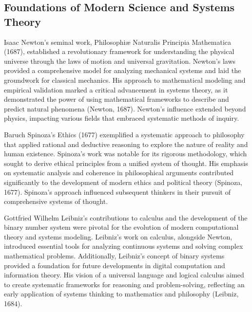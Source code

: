 \documentclass[twocolumn]{article}
\begin{document}
\subsection{Foundations of Modern Science and Systems Theory}

\textcolor{primary}{Isaac Newton’s seminal work, Philosophiæ Naturalis Principia Mathematica (1687), established a revolutionary framework for understanding the physical universe through the laws of motion and universal gravitation. Newton’s laws provided a comprehensive model for analyzing mechanical systems and laid the groundwork for classical mechanics. His approach to mathematical modeling and empirical validation marked a critical advancement in systems theory, as it demonstrated the power of using mathematical frameworks to describe and predict natural phenomena (Newton, 1687). Newton’s influence extended beyond physics, impacting various fields that embraced systematic methods of inquiry.}

\textcolor{secondary}{Baruch Spinoza’s Ethics (1677) exemplified a systematic approach to philosophy that applied rational and deductive reasoning to explore the nature of reality and human existence. Spinoza’s work was notable for its rigorous methodology, which sought to derive ethical principles from a unified system of thought. His emphasis on systematic analysis and coherence in philosophical arguments contributed significantly to the development of modern ethics and political theory (Spinoza, 1677). Spinoza’s approach influenced subsequent thinkers in their pursuit of comprehensive systems of thought.}

\textcolor{primary}{Gottfried Wilhelm Leibniz’s contributions to calculus and the development of the binary number system were pivotal for the evolution of modern computational theory and systems modeling. Leibniz’s work on calculus, alongside Newton, introduced essential tools for analyzing continuous systems and solving complex mathematical problems. Additionally, Leibniz’s concept of binary systems provided a foundation for future developments in digital computation and information theory. His vision of a universal language and logical calculus aimed to create systematic frameworks for reasoning and problem-solving, reflecting an early application of systems thinking to mathematics and philosophy (Leibniz, 1684).}
\end{document}
